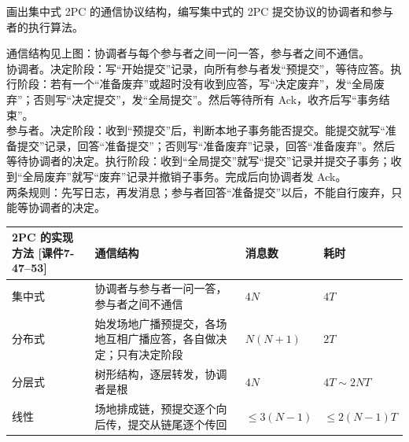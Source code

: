 \documentclass[10pt,a4paper]{article}
\newcommand{\kj}[1]{\textsf{\small[课件#1]}}
\newenvironment{keep}{\par\noindent\begin{minipage}{\linewidth}\setlength{\parskip}{3pt plus 1pt}}{\end{minipage}\par\vspace{2pt}}
\begin{document}
\begin{keep}
\begin{prob}[2004 年第 2 题]
画出集中式 2PC 的通信协议结构，编写集中式的 2PC 提交协议的协调者和参与者的执行算法。
\end{prob}
\begin{ans}[2004 年第 2 题]
通信结构见上图：协调者与每个参与者之间一问一答，参与者之间不通信。\\
协调者。决定阶段：写“开始提交”记录，向所有参与者发“预提交”，等待应答。执行阶段：若有一个“准备废弃”或超时没有收到应答，写“决定废弃”，发“全局废弃”；否则写“决定提交”，发“全局提交”。然后等待所有 Ack，收齐后写“事务结束”。\\
参与者。决定阶段：收到“预提交”后，判断本地子事务能否提交。能提交就写“准备提交”记录，回答“准备提交”；否则写“准备废弃”记录，回答“准备废弃”。然后等待协调者的决定。执行阶段：收到“全局提交”就写“提交”记录并提交子事务；收到“全局废弃”就写“废弃”记录并撤销子事务。完成后向协调者发 Ack。\\
两条规则：先写日志，再发消息；参与者回答“准备提交”以后，不能自行废弃，只能等协调者的决定。
\end{ans}
\end{keep}
{\small
\begin{tabularx}{\linewidth}{@{}l X l l@{}}
\toprule
2PC 的实现方法 \kj{7-47--53} & 通信结构 & 消息数 & 耗时\\ \midrule
集中式 & 协调者与参与者一问一答，参与者之间不通信 & $4N$ & $4T$\\
分布式 & 始发场地广播预提交，各场地互相广播应答，各自做决定；只有决定阶段 & $N(N+1)$ & $2T$\\
分层式 & 树形结构，逐层转发，协调者是根 & $4N$ & $4T\sim2NT$\\
线性 & 场地排成链，预提交逐个向后传，提交从链尾逐个传回 & $\le3(N-1)$ & $\le2(N-1)T$\\
\bottomrule
\end{tabularx}}

\end{document}
